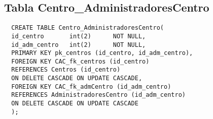 \subsection{Tabla Centro\_AdministradoresCentro}

\begin{verbatim}
  CREATE TABLE Centro_AdministradoresCentro(
  id_centro       int(2)      NOT NULL,
  id_adm_centro   int(2)      NOT NULL,
  PRIMARY KEY pk_centros (id_centro, id_adm_centro),
  FOREIGN KEY CAC_fk_centros (id_centro)
  REFERENCES Centros (id_centro)
  ON DELETE CASCADE ON UPDATE CASCADE,
  FOREIGN KEY CAC_fk_admCentro (id_adm_centro)
  REFERENCES AdministradoresCentro (id_adm_centro)
  ON DELETE CASCADE ON UPDATE CASCADE
  );
\end{verbatim}
